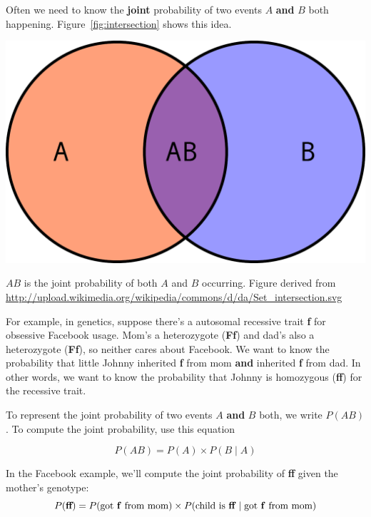 \documentclass[12pt]{tufte-handout}
\begin{document}
Often we need to know the \textbf{joint} probability of two events $A$ \textbf{and} $B$ both happening.  Figure~\ref{fig:intersection} shows this idea.
\begin{marginfigure}[1.5cm]
\centering
\includegraphics[width=0.7\marginparwidth]{wikipedia_Set_intersection.pdf}
\caption{$AB$ is the joint probability of both $A$ and $B$ occurring.  Figure derived from
\url{http://upload.wikimedia.org/wikipedia/commons/d/da/Set_intersection.svg}}
\label{fig:intersection}
\end{marginfigure}


For example, in genetics, suppose there's a autosomal recessive trait \textbf{f} for obsessive Facebook usage.  Mom's a heterozygote (\textbf{Ff}) and dad's also a heterozygote (\textbf{Ff}), so neither cares about Facebook.  We want to know the probability that little Johnny inherited \textbf{f} from mom \textbf{and} inherited \textbf{f} from dad.   In other words, we want to know the probability that Johnny is homozygous (\textbf{ff}) for the recessive trait.  


To  represent the joint probability of two events $A$ \textbf{and} $B$ both, we write $P(AB)$.     To compute the joint probability, use this equation

\begin{equation}
\label{eq:jointProbability}
P(AB) = P(A)  \times  P(B \mid A)
\end{equation}


In the Facebook example, we'll compute the joint probability of \textbf{ff} given the mother's genotype:
\[
P(\textbf{ff}) = P(\text{got \textbf{f} from mom}) \times
                 P(\text{child is \textbf{ff}}  \mid  \text{got \textbf{f} from mom})
\]
\end{document}
